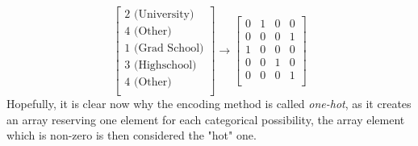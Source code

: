             \begin{equation}
                \begin{bmatrix}
                \text{2 (University)}\\
                \text{4 (Other)}\\
                \text{1 (Grad School)}\\
                \text{3 (Highschool)}\\
                \text{4 (Other)}\\
                \end{bmatrix}
                \rightarrow
                \begin{bmatrix}
                0 & 1 & 0 & 0 \\
                0 & 0 & 0 & 1\\
                1 & 0 & 0 & 0\\
                0 & 0 & 1 & 0\\
                0 & 0 & 0 & 1\\
                \end{bmatrix}
            \end{equation}
            Hopefully, it is clear now why the encoding method is called \textit{one-hot}, as it creates an array reserving one element for each categorical possibility, the array element which is non-zero is then considered the "hot" one.
